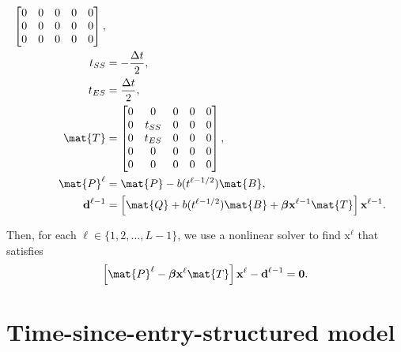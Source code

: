 \documentclass{jpmarticle}
\renewcommand{\vec}[1]{\boldsymbol{\mathrm{#1}}}
\let\subequationsorig\subequations%
\let\endsubequationsorig\endsubequations%
\renewenvironment{subequations}{
  \subequationsorig
  \renewcommand{\theequation}{\theparentequation.\arabic{equation}}
}{
  \endsubequationsorig
}
\begin{document}
\begin{subequations}
\begin{align}
\begin{bmatrix}
      0 & 0 & 0 & 0 & 0
      \\
      0 & 0 & 0 & 0 & 0
      \\
      0 & 0 & 0 & 0 & 0
    \end{bmatrix},
    \\
    t_{SS} &= - \frac{\Delta t}{2},
    \\
    t_{ES} &= \frac{\Delta t}{2},
    \\
    \mat{T} &=
    \begin{bmatrix}
      0 & 0 & 0 & 0 & 0
      \\
      0 & t_{SS} & 0 & 0 & 0
      \\
      0 & t_{ES} & 0 & 0 & 0
      \\
      0 & 0 & 0 & 0 & 0
      \\
      0 & 0 & 0 & 0 & 0
    \end{bmatrix},
    \\
    \mat{P}^{\ell} &=
    \mat{P} - b(t^{\ell - 1 / 2}) \mat{B},
    \\
    \vec{d}^{\ell - 1} &=
    \left[
      \mat{Q}
      + b(t^{\ell - 1 / 2}) \mat{B}
      + \vec{\beta} \vec{x}^{\ell - 1} \mat{T}
    \right] \vec{x}^{\ell - 1}.
  \end{align}
\end{subequations}
Then, for each $\ell \in \{1, 2, \ldots, L - 1\}$,
we use a nonlinear solver to find $\vec{x}^{\ell}$ that satisfies
\begin{equation}
  \left[
    \mat{P}^{\ell}
    - \vec{\beta} \vec{x}^{\ell} \mat{T}
  \right] \vec{x}^{\ell}
  - \vec{d}^{\ell - 1}
  = \vec{0}.
\end{equation}


\section{Time-since-entry-structured model}
\end{document}
